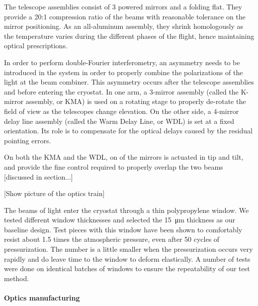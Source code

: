 The telescope assemblies consist of 3 powered mirrors and a folding flat. They provide a 20:1 compression ratio of the beams with reasonable tolerance on the mirror positioning. As an all-aluminum assembly, they shrink homologously as the temperature varies during the different phases of the flight, hence maintaining optical prescriptions. 

In order to perform double-Fourier interferometry, an asymmetry needs to be introduced in the system in order to properly combine the polarizations of the light at the beam combiner. This asymmetry occurs after the telescope assemblies and before entering the cryostat. In one arm, a 3-mirror assembly (called the K-mirror assembly, or KMA) is used on a rotating stage to properly de-rotate the field of view as the telescopes change elevation. On the other side, a 4-mirror delay line assembly (called the Warm Delay Line, or WDL) is set at a fixed orientation. Its role is to compensate for the optical delays caused by the residual pointing errors. 

On both the KMA and the WDL, on of the mirrors is actuated in tip and tilt, and provide the fine control required to properly overlap the two beams [discussed in section...]

[Show picture of the optics train]

The beams of light enter the cryostat through a thin polypropylene window. We tested different window thicknesses and selected the \SI{15}{\micro\meter} thickness as our baseline design. Test pieces with this window have been shown to comfortably resist about 1.5 times the atmospheric pressure, even after 50 cycles of pressurization. The number is a little smaller when the pressurization occurs very rapidly and do leave time to the window to deform elastically. A number of tests were done on identical batches of windows to ensure the repeatability of our test method. 




\paragraph{Optics manufacturing}

